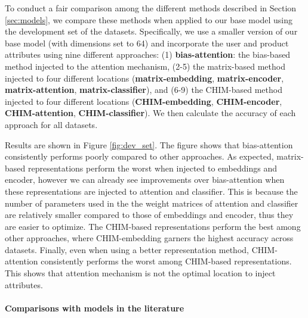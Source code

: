 \documentclass[11pt,a4paper]{article}
\begin{document}
To conduct a fair comparison among the different methods described in Section \ref{sec:models}, we compare these methods when applied to our base model using the development set of the datasets. Specifically, we use a smaller version of our base model (with dimensions set to 64) and incorporate the user and product attributes using nine different approaches: (1) \textbf{bias-attention}: the bias-based method injected to the attention mechanism, (2-5) the matrix-based method injected to four different locations (\textbf{matrix-embedding}, \textbf{matrix-encoder}, \textbf{matrix-attention}, \textbf{matrix-classifier}), and (6-9) the CHIM-based method injected to four different locations (\textbf{CHIM-embedding}, \textbf{CHIM-encoder}, \textbf{CHIM-attention}, \textbf{CHIM-classifier}). We then calculate the accuracy of each approach for all datasets.

Results are shown in Figure \ref{fig:dev_set}. The figure shows that bias-attention consistently performs poorly compared to other approaches. As expected, matrix-based representations perform the worst when injected to embeddings and encoder, however we can already see improvements over bias-attention when these representations are injected to attention and classifier. This is because the number of parameters used in the the weight matrices of attention and classifier are relatively smaller compared to those of embeddings and encoder, thus they are easier to optimize. The CHIM-based representations perform the best among other approaches, where CHIM-embedding garners the highest accuracy across datasets. Finally, even when using a better representation method, CHIM-attention consistently performs the worst among CHIM-based representations. This shows that attention mechanism is not the optimal location to inject attributes.

\paragraph{Comparisons with models in the literature}
\end{document}

